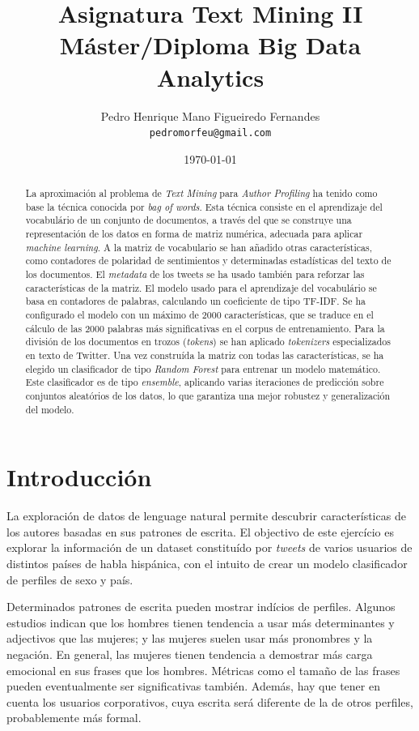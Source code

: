 \documentclass[11pt,a4paper]{article}
\title{Asignatura Text Mining II\\
M\'aster/Diploma Big Data Analytics}
\author{Pedro Henrique Mano Figueiredo Fernandes \\
  {\tt pedromorfeu@gmail.com} \\}
\date{\today}
\begin{document}
\maketitle
\begin{abstract}

  La aproximaci\'on al problema de {\em Text Mining} para {\em Author Profiling} ha tenido como base la t\'ecnica conocida por {\em bag of words}. Esta t\'ecnica consiste en el aprendizaje del vocabul\'ario de un conjunto de documentos, a trav\'es del que se construye una representaci\'on de los datos en forma de matriz num\'erica, adecuada para aplicar {\em machine learning}. A la matriz de vocabulario se han a\~nadido otras caracter\'isticas, como contadores de polaridad de sentimientos y determinadas estad\'isticas del texto de los documentos. El {\em metadata} de los tweets se ha usado tambi\'en para reforzar las caracter\'isticas de la matriz.
  El modelo usado para el aprendizaje del vocabul\'ario se basa en contadores de palabras, calculando un coeficiente de tipo TF-IDF. Se ha configurado el modelo con un m\'aximo de 2000 caracter\'isticas, que se traduce en el c\'alculo de las 2000 palabras más significativas en el corpus de entrenamiento. Para la divisi\'on de los documentos en trozos ({\em tokens}) se han aplicado {\em tokenizers} especializados en texto de Twitter.
  Una vez constru\'ida la matriz con todas las caracter\'isticas, se ha elegido un clasificador de tipo {\em Random Forest} para entrenar un modelo matem\'atico. Este clasificador es de tipo {\em ensemble}, aplicando varias iteraciones de predicci\'on sobre conjuntos aleat\'orios de los datos, lo que garantiza una mejor robustez y generalizaci\'on del modelo.

\end{abstract}


\section{Introducci\'on}

  La exploraci\'on de datos de lenguage natural permite descubrir caracter\'isticas de los autores basadas en sus patrones de escrita. El objectivo de este ejerc\'icio es explorar la informaci\'on de un dataset constitu\'ido por {\em tweets} de varios usuarios de distintos pa\'ises de habla hisp\'anica, con el intuito de crear un modelo clasificador de perfiles de sexo y pa\'is.

  Determinados patrones de escrita pueden mostrar ind\'icios de perfiles. Algunos estudios indican que los hombres tienen tendencia a usar m\'as determinantes y adjectivos que las mujeres; y las mujeres suelen usar m\'as pronombres y la negaci\'on. En general, las mujeres tienen tendencia a demostrar m\'as carga emocional en sus frases que los hombres. M\'etricas como el tama\~no de las frases pueden eventualmente ser significativas tambi\'en. Adem\'as, hay que tener en cuenta los usuarios corporativos, cuya escrita ser\'a diferente de la de otros perfiles, probablemente m\'as formal.
\end{document}
